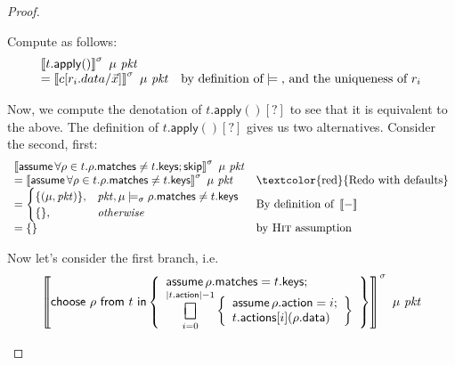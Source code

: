 \documentclass{article}
\newcommand{\pkt}{\mathit{pkt}}
\newcommand{\denote}[1]{\left\llbracket#1\right\rrbracket}
\newcommand{\matches}{\mathsf{matches}}
\newcommand{\action}{\mathsf{action}}
\newcommand{\actions}{\mathsf{actions}}
\newcommand{\keys}{\mathsf{keys}}
\newcommand{\data}{\mathsf{data}}
\newcommand{\assume}{\mathop{\mathsf{assume}}}
\newcommand{\apply}{\mathsf{apply}}
\newcommand{\choiceop}{\rotatebox[origin=c]{90}{$\sqsubset\!\!\!\sqsupset$}}
\DeclareMathOperator*{\bigchoice}{\scalerel*{\choiceop}{\sum}}
\renewcommand{\choose}[2]{\mathop{\mathsf{choose}~#1~\mathsf{from}~#2~\mathsf{in}}}
\newcommand{\SKIP}{\mathsf{skip}}
\begin{document}
\begin{proof}
\begin{enumerate}[align=left]
\begin{enumerate}
      Compute as follows:
      \[\begin{array}{>{\displaystyle}ll}
      \denote{t.\apply()}^\sigma~\mu~\pkt \\
      = \denote{c[r_i.data/\vec x]}^\sigma~\mu~\pkt & \text{by definition of} \models \text{, and the uniqueness of }r_i  \\
      \end{array}
      \]

      Now, we compute the denotation of $t.\apply()[?]$ to see that it is equivalent to the above.
      The definition of $t.\apply()[?]$ gives us two alternatives. Consider the second, first:
      \[\begin{array}{>{\displaystyle}ll}
        \denote{\assume \forall \rho \in t. \rho.\matches \neq t.\keys;\SKIP}^\sigma~\mu~\pkt \\
        = \denote{\assume \forall \rho \in t. \rho.\matches \neq t.\keys}^\sigma~\mu~\pkt
        & \textrm{\textcolor{red}{Redo with defaults}} \\
        = \begin{cases}
          \{(\mu,\pkt)\}, & \pkt,\mu \models_\sigma \rho.\matches \neq t.\keys \\
          \{\}, &\textit{otherwise}
        \end{cases}
        & \textrm{By definition of }\denote{-}\\
        =  \{\}
        & \textrm{by \textsc{Hit} assumption}
      \end{array}
      \]

      Now let's consider the first branch, i.e.
      \[
      \denote{\choose \rho t \left\{
        \begin{array}{>{\displaystyle}l}
          \assume \rho.\matches = t.\keys;\\
          \bigchoice_{i=0}^{|t.\action| -1}
          \left\{\begin{array}{l}
          \assume \rho.\action = i;\\
          t.\actions[i](\rho.\data)
          \end{array}\right\}
        \end{array}\right\}
      }^\sigma~\mu~\pkt\]


\end{enumerate}
\end{enumerate}
\end{proof}
\end{document}
